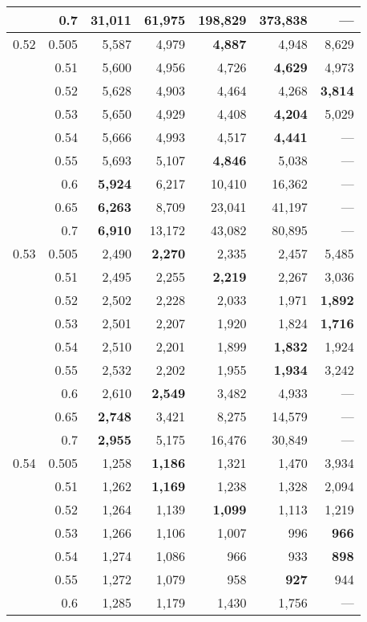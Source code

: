 \documentclass[12pt,runningheads]{llncs}
\begin{document}
{\begin{table}
\begin{tabular}{lr|rrrr|r}
     & 0.7 & \bf{31,011} & 61,975 & 198,829 & 373,838  & --- \\
\hline
0.52 & 0.505 & 5,587 & 4,979 & \bf{4,887} & 4,948  & 8,629 \\
     & 0.51 & 5,600 & 4,956 & 4,726 & \bf{4,629}  & 4,973 \\
     & 0.52 & 5,628 & 4,903 & 4,464 & 4,268  & \bf{3,814} \\
     & 0.53 & 5,650 & 4,929 & 4,408 & \bf{4,204}  & 5,029 \\
     & 0.54 & 5,666 & 4,993 & 4,517 & \bf{4,441}  & --- \\
     & 0.55 & 5,693 & 5,107 & \bf{4,846} & 5,038  & --- \\
     & 0.6 & \bf{5,924} & 6,217 & 10,410 & 16,362  & --- \\
     & 0.65 & \bf{6,263} & 8,709 & 23,041 & 41,197  & --- \\
     & 0.7 & \bf{6,910} & 13,172 & 43,082 & 80,895  & --- \\
\hline
0.53 & 0.505 & 2,490 & \bf{2,270} & 2,335 & 2,457  & 5,485 \\
     & 0.51 & 2,495 & 2,255 & \bf{2,219} & 2,267  & 3,036 \\
     & 0.52 & 2,502 & 2,228 & 2,033 & 1,971  & \bf{1,892} \\
     & 0.53 & 2,501 & 2,207 & 1,920 & 1,824  & \bf{1,716} \\
     & 0.54 & 2,510 & 2,201 & 1,899 & \bf{1,832}  & 1,924 \\
     & 0.55 & 2,532 & 2,202 & 1,955 & \bf{1,934}  & 3,242 \\
     & 0.6 & 2,610 & \bf{2,549} & 3,482 & 4,933  & --- \\
     & 0.65 & \bf{2,748} & 3,421 & 8,275 & 14,579  & --- \\
     & 0.7 & \bf{2,955} & 5,175 & 16,476 & 30,849  & --- \\
\hline
0.54 & 0.505 & 1,258 & \bf{1,186} & 1,321 & 1,470  & 3,934 \\
     & 0.51 & 1,262 & \bf{1,169} & 1,238 & 1,328  & 2,094 \\
     & 0.52 & 1,264 & 1,139 & \bf{1,099} & 1,113  & 1,219 \\
     & 0.53 & 1,266 & 1,106 & 1,007 & 996  & \bf{966} \\
     & 0.54 & 1,274 & 1,086 & 966 & 933  & \bf{898} \\
     & 0.55 & 1,272 & 1,079 & 958 & \bf{927}  & 944 \\
     & 0.6 & 1,285 & 1,179 & 1,430 & 1,756  & --- \\

\end{tabular}
\end{table}}
\end{document}
